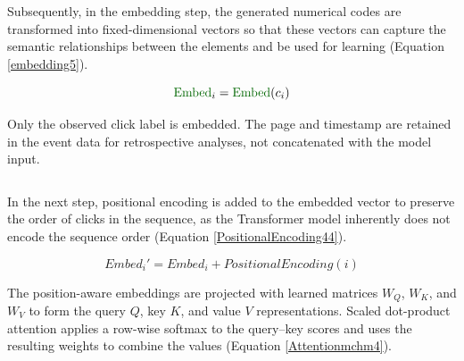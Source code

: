 \documentclass[sn-mathphys-num, Numbered]{sn-jnl}%
\theoremstyle{thmstyleone}%
\theoremstyle{thmstyletwo}%
\theoremstyle{thmstylethree}%
\providecommand{\DIFadd}[1]{{\protect\color{green!40!black}#1}} %
\providecommand{\DIFdel}[1]{}                      %
\providecommand{\DIFaddbegin}{} %
\providecommand{\DIFaddend}{} %
\providecommand{\DIFdelbegin}{} %
\providecommand{\DIFdelend}{} %
\newcommand{\DIFscaledelfig}{0.5}
\newlength{\DIFdelgraphicswidth} %
\newlength{\DIFdelgraphicsheight} %
\newcommand{\DIFaddincludegraphics}[2][]{{\color{blue}\fbox{\DIFOincludegraphics[#1]{#2}}}} %
\newcommand{\DIFdelincludegraphics}[2][]{%
\sbox{\DIFdelgraphicsbox}{\DIFOincludegraphics[#1]{#2}}%
\settoboxwidth{\DIFdelgraphicswidth}{\DIFdelgraphicsbox} %
\settoboxtotalheight{\DIFdelgraphicsheight}{\DIFdelgraphicsbox} %
\scalebox{\DIFscaledelfig}{%
\parbox[b]{\DIFdelgraphicswidth}{\usebox{\DIFdelgraphicsbox}\\[-\baselineskip] \rule{\DIFdelgraphicswidth}{0em}}\llap{\resizebox{\DIFdelgraphicswidth}{\DIFdelgraphicsheight}{%
\setlength{\unitlength}{\DIFdelgraphicswidth}%
\begin{picture}(1,1)%
\thicklines\linethickness{2pt} %
{\color[rgb]{1,0,0}\put(0,0){\framebox(1,1){}}}%
{\color[rgb]{1,0,0}\put(0,0){\line( 1,1){1}}}%
{\color[rgb]{1,0,0}\put(0,1){\line(1,-1){1}}}%
\end{picture}%
}\hspace*{3pt}}} %
} %
\DeclareRobustCommand{\DIFaddbegin}{\DIFOaddbegin \let\includegraphics\DIFaddincludegraphics} %
\DeclareRobustCommand{\DIFaddend}{\DIFOaddend \let\includegraphics\DIFOincludegraphics} %
\DeclareRobustCommand{\DIFdelbegin}{\DIFOdelbegin \let\includegraphics\DIFdelincludegraphics} %
\DeclareRobustCommand{\DIFdelend}{\DIFOaddend \let\includegraphics\DIFOincludegraphics} %
\begin{document}
Subsequently, in the embedding step, the generated numerical codes are transformed into fixed-dimensional vectors so that these vectors can capture the semantic relationships between the elements and be used for learning (Equation \ref{embedding5}).

\begin{equation}\label{embedding5}
	\DIFdelbegin \DIFdel{Embed}\DIFdelend \DIFaddbegin \DIFadd{\mathrm{Embed}}\DIFaddend _i = \DIFdelbegin \DIFdel{Embed }\DIFdelend \DIFaddbegin \DIFadd{\mathrm{Embed}}\DIFaddend (\DIFdelbegin \DIFdel{s_i, }\DIFdelend c_i\DIFdelbegin \DIFdel{, t_i}\DIFdelend ) 
\end{equation}

\DIFdelbegin \DIFdel{In the embedding function, each component of the input, including the page, element, and time, is mapped into a vector space using the embedding function. The embeddings of the page , element, and time are then combined to form a single vector}\DIFdelend \DIFaddbegin \DIFadd{Only the observed click label is embedded. The page and timestamp are retained in the event data for retrospective analyses, not concatenated with the model input}\DIFaddend .

\DIFdelbegin \begin{displaymath}
	\DIFdel{Embed'_i = }[\DIFdel{Embed_{s_i}, Embed_{c_i}, Embed_{t_i}}]
\DIFdel{}\end{displaymath}%

\DIFdelend In the next step, positional encoding is added to the embedded vector to preserve the order of clicks in the sequence, as the Transformer model inherently does not encode the sequence order (Equation \ref{PositionalEncoding44}).

\begin{equation}\label{PositionalEncoding44}
	Embed_i' = Embed_i + {PositionalEncoding}(i)
\end{equation}

\DIFdelbegin \DIFdel{In the next step, the embedded vectors Embedi \( Embed_i' \) are multiplied by the weight matrices \( W_Q \), \( W_K \), and \( W_V \) to produce the matrices.
$Q$}\DIFdel{, $K$, and $V$}
\DIFdel{In the next step, the embedded vectors Embedi \( Embed_i' \) are multiplied by the weight matrices  \( W_Q \), \( W_K \), and \( W_V \) to produce the matrices. $Q$}
\DIFdel{,
$K$,and $V$}
\DIFdel{To calculate attention , the attention mechanism computes the relationship of each element in the sequence with other elements and assigns an attention score to each element. The SoftmaxSoftmaxSoftmax function normalizes these scores such that their sum equals 1, highlighting the most prominent elements.
The attention scores are then used to weight the ValueValue matrix, producing the final output of the attention mechanism }\DIFdelend \DIFaddbegin \smallskip
\DIFadd{The position-aware embeddings are projected with learned matrices \(W_Q\), \(W_K\), and \(W_V\) to form the query \(Q\), key \(K\), and value \(V\) representations. Scaled dot-product attention applies a row-wise softmax to the query--key scores and uses the resulting weights to combine the values }\DIFaddend (Equation \ref{Attentionmchm4}).
\end{document}
